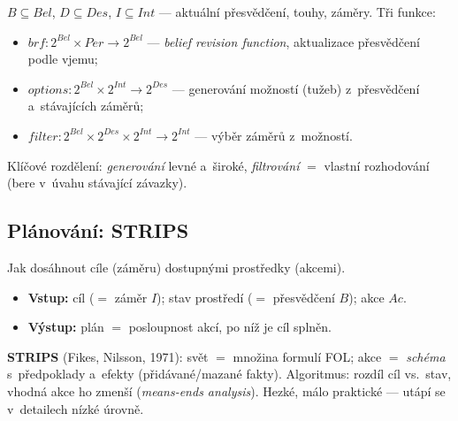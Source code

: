\documentclass[11pt,a4paper]{article}
\theoremstyle{definition}
\begin{document}
\begin{defbox}
$B \subseteq \mathit{Bel}$, $D \subseteq \mathit{Des}$, $I \subseteq \mathit{Int}$ --- aktuální
přesvědčení, touhy, záměry. Tři funkce:
\begin{itemize}
\item $\mathit{brf} : 2^{\mathit{Bel}} \times \mathit{Per} \to 2^{\mathit{Bel}}$ ---
  \emph{belief revision function}, aktualizace přesvědčení podle vjemu;
\item $\mathit{options} : 2^{\mathit{Bel}} \times 2^{\mathit{Int}} \to 2^{\mathit{Des}}$ ---
  generování možností (tužeb) z~přesvědčení a~stávajících záměrů;
\item $\mathit{filter} : 2^{\mathit{Bel}} \times 2^{\mathit{Des}} \times 2^{\mathit{Int}}
  \to 2^{\mathit{Int}}$ --- výběr záměrů z~možností.
\end{itemize}
Klíčové rozdělení: \emph{generování} levné a~široké, \emph{filtrování} $=$ vlastní rozhodování
(bere v~úvahu stávající závazky).
\end{defbox}

\subsection{Plánování: STRIPS}

\begin{defbox}
Jak dosáhnout cíle (záměru) dostupnými prostředky (akcemi).
\begin{itemize}
\item \textbf{Vstup:} cíl ($=$ záměr $I$); stav prostředí ($=$ přesvědčení $B$); akce
  $\mathit{Ac}$.
\item \textbf{Výstup:} plán $=$ posloupnost akcí, po níž je cíl splněn.
\end{itemize}
\end{defbox}

\textbf{STRIPS} (Fikes, Nilsson, 1971): svět $=$ množina formulí FOL; akce $=$ \emph{schéma}
s~předpoklady a~efekty (přidávané/mazané fakty). Algoritmus: rozdíl cíl vs.\ stav, vhodná akce
ho zmenší (\emph{means-ends analysis}). Hezké, málo praktické --- utápí se v~detailech nízké úrovně.
\end{document}
